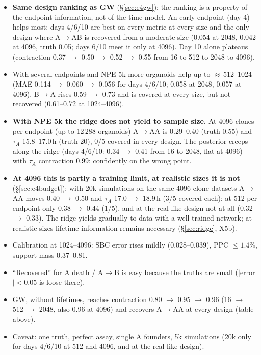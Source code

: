\documentclass[10pt,a4paper]{article}
\newcommand{\tA}{$\tau_A$}
\begin{document}
\begin{itemize}
\item \textbf{Same design ranking as GW} (\S\ref{sec:e4gw}): the ranking is a property of the endpoint information, not of the time model. An early endpoint (day 4) helps most: days 4/6/10 are best on every metric at every size and the only design where A$\to$AB is recovered from a moderate size (0.054 at 2048, 0.042 at 4096, truth 0.05; days 6/10 meet it only at 4096). Day 10 alone plateaus (contraction 0.37 $\to$ 0.50 $\to$ 0.52 $\to$ 0.55 from 16 to 512 to 2048 to 4096).
\item With several endpoints and NPE 5k more organoids help up to $\approx$\,512--1024 (MAE 0.114 $\to$ 0.060 $\to$ 0.056 for days 4/6/10; 0.058 at 2048, 0.057 at 4096). B$\to$A rises 0.59 $\to$ 0.73 and is covered at every size, but not recovered (0.61--0.72 at 1024--4096).
\item \textbf{With NPE 5k the ridge does not yield to sample size.} At 4096 clones per endpoint (up to 12\,288 organoids) A$\to$AA is 0.29--0.40 (truth 0.55) and \tA{} 15.8--17.0\,h (truth 20), 0/5 covered in every design. The posterior creeps along the ridge (days 4/6/10: 0.34 $\to$ 0.41 from 16 to 2048, flat at 4096) with \tA{} contraction 0.99: confidently on the wrong point.
\item \textbf{At 4096 this is partly a training limit, at realistic sizes it is not} (\S\ref{sec:e4budget}): with 20k simulations on the same 4096-clone datasets A$\to$AA moves 0.40 $\to$ 0.50 and \tA{} 17.0 $\to$ 18.9\,h (3/5 covered each); at 512 per endpoint only 0.38 $\to$ 0.44 (1/5), and at the real-like design not at all (0.32 $\to$ 0.33). The ridge yields gradually to data with a well-trained network; at realistic sizes lifetime information remains necessary (\S\ref{sec:ridge}, X5b).
\item Calibration at 1024--4096: SBC error rises mildly (0.028--0.039), PPC $\le 1.4\%$, support mass 0.37--0.81.
\item ``Recovered'' for A death / A$\to$B is easy because the truths are small ($|$error$|<0.05$ is loose there).
\item GW, without lifetimes, reaches contraction 0.80 $\to$ 0.95 $\to$ 0.96 (16 $\to$ 512 $\to$ 2048, also 0.96 at 4096) and recovers A$\to$AA at every design (table above).
\item Caveat: one truth, perfect assay, single A founders, 5k simulations (20k only for days 4/6/10 at 512 and 4096, and at the real-like design).
\end{itemize}
\end{document}

